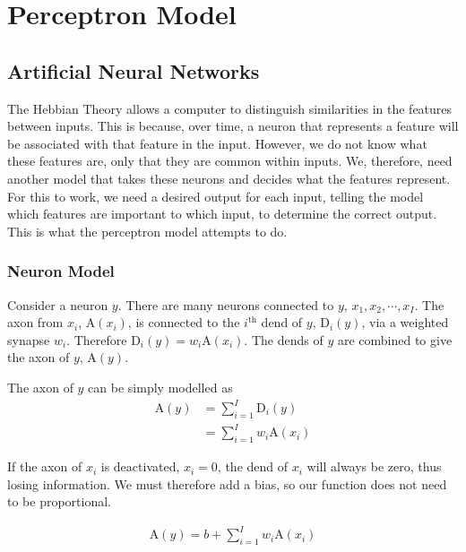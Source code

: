 \section{Perceptron Model}
\label{pmodel}

\subsection{Artificial Neural Networks}

The Hebbian Theory allows a computer to distinguish similarities in the features between inputs. This is because, over time, a \gls{neuron} that represents a feature will be associated with that feature in the input. However, we do not know what these features are, only that they are common within inputs. We, therefore, need another \gls{model} that takes these \gls{neuron}s and decides what the features represent. For this to work, we need a desired output for each input, telling the \gls{model} which features are important to which input, to determine the correct output.
This is what the \gls{perceptron} \gls{model} attempts to do.

\subsubsection{Neuron Model}

Consider a \gls{neuron} $y$. There are many \gls{neuron}s connected to $y$, $x_1, x_2, \cdots, x_I$. The \gls{axon} from $x_i$, $\text{A}(x_i)$, is connected to the $i^\text{th}$ \gls{dend} of $y$, $\text{D}_i(y)$, via a weighted \gls{synapse} $w_{i}$. Therefore $\text{D}_i(y)=w_i\text{A}(x_i)$. The \gls{dend}s of $y$ are combined to give the \gls{axon} of $y$, $\text{A}(y)$.\cite[p.~84]{nnd}

The \gls{axon} of $y$ can be simply \gls{model}led as 
\begin{equation}
\begin{split}
    \text{A}(y)&=\sum^I_{i=1}\text{D}_i(y)\\
    &=\sum^I_{i=1}w_i\text{A}(x_i)
\end{split}
\label{eq:nnmaxon}
\end{equation} 

If the \gls{axon} of $x_i$ is deactivated, $x_i=0$, the \gls{dend} of $x_i$ will always be zero, thus losing information. We must therefore add a bias, so our function does not need to be proportional.

\begin{equation}
\begin{split}
    \text{A}(y)=b+\sum^I_{i=1}w_i\text{A}(x_i)
\end{split}
\label{eq:nmaxon}
\end{equation} 

